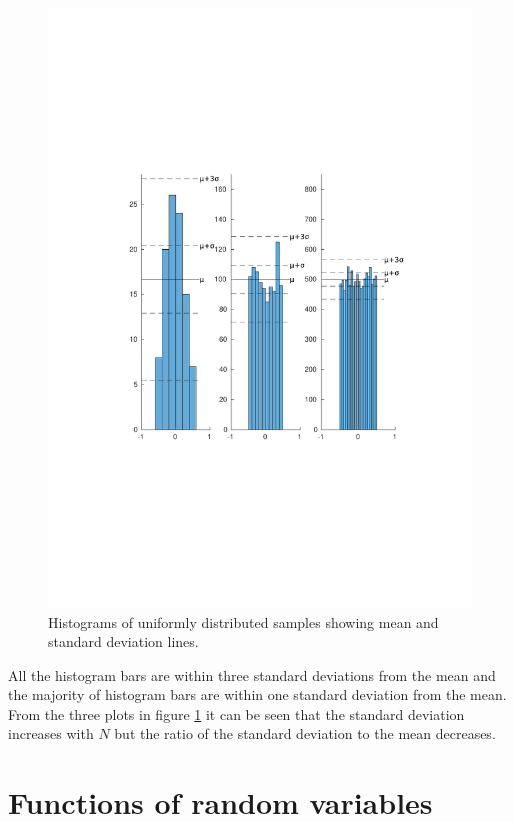 \documentclass[12pt]{article}
\begin{document}
\begin{figure}[H]
\includegraphics[width=\textwidth]{figures/uniform-bar-distribution.pdf}
  \caption{Histograms of uniformly distributed samples showing mean and standard deviation lines.}
  \label{fig:hist-dist}
\end{figure}

All the histogram bars are within three standard deviations from the mean and the majority of histogram bars are within one standard deviation from the mean. From the three plots in figure \ref{fig:hist-dist} it can be seen that the standard deviation increases with $N$ but the ratio of the standard deviation to the mean decreases.


\section{Functions of random variables}
\end{document}
